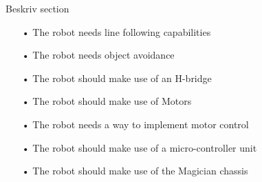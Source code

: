 Beskriv section
\cite{ucn}
\begin{enumerate}
	\item[•]The robot needs line following capabilities\\
	\item[•]The robot needs object avoidance\\
	\item[•]The robot should make use of an H-bridge\\
	\item[•]The robot should make use of Motors\\
	\item[•]The robot needs a way to implement motor control\\
	\item[•]The robot should make use of a micro-controller unit\\
	\item[•]The robot should make use of the Magician chassis\\
\end{enumerate}

